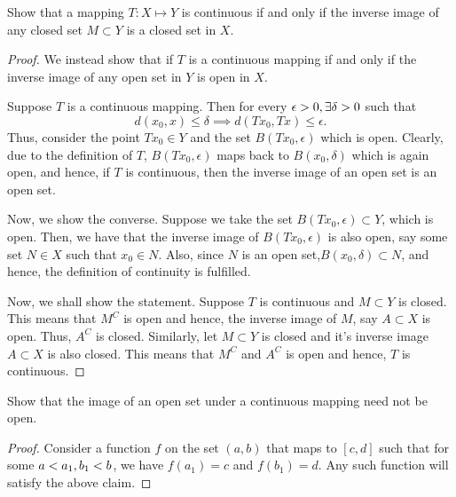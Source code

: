 \begin{question}
    Show that a mapping $T : X \mapsto Y$ is continuous if and only if the inverse image of any closed set $M \subset Y$ is a closed set in $X$.
    \label{section1.3-14}
\end{question}
\begin{proof}
    We instead show that if $T$ is a continuous mapping if and only if the inverse image of any open set in $Y$ is open in $X$.

    Suppose $T$ is a continuous mapping. Then for every $\epsilon > 0, \exists \delta > 0$ such that 
    \[d(x_0,x) \leq \delta \implies d(Tx_0 , Tx) \leq \epsilon.\]
    Thus, consider the point $Tx_0 \in Y$ and the set $B(Tx_0 , \epsilon)$ which is open. Clearly, due to the definition of $T$, $B(Tx_0,\epsilon)$ maps back to $B(x_0 , \delta)$ which is again open, and hence, if $T$ is continuous, then the inverse image of an open set is an open set.

    Now, we show the converse. Suppose we take the set $B(Tx_0 , \epsilon) \subset Y$, which is open. Then, we have that the inverse image of $B(Tx_0 , \epsilon)$ is also open, say some set $N \in X$ such that $x_0 \in N$. Also, since $N$ is an open set,$B(x_0 , \delta) \subset N$, and hence, the definition of continuity is fulfilled.

    Now, we shall show the statement. Suppose $T$ is continuous and $M \subset Y$ is closed. This means that $M^C$ is open and hence, the inverse image of $M$, say $A \subset X$ is open. Thus, $A^C$ is closed. Similarly, let $M \subset Y$ is closed and it's inverse image $A \subset X$ is also closed. This means that $M^C$ and $A^C$ is open and hence, $T$ is continuous.
\end{proof}

\begin{question}
Show that the image of an open set under a continuous mapping need not be open.
\label{section1.3-15}
\end{question}
\begin{proof}
    Consider a function $f$ on the set $(a,b)$ that maps to $[c,d]$ such that for some $a < a_1,b_1 < b$, we have $f(a_1) = c$ and $f(b_1) = d$. Any such function  will satisfy the above claim.
\end{proof}
